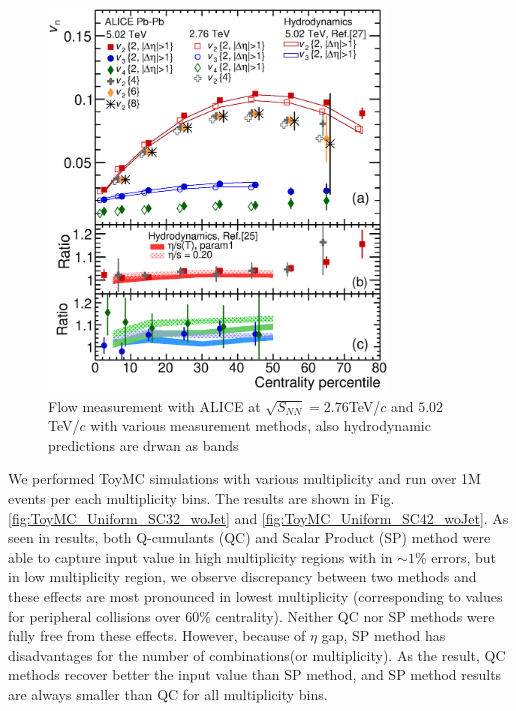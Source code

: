 \begin{figure}[h]
\begin{center}
\includegraphics[width=9.0cm]{figures/5tev_vns}
\caption{Flow measurement with ALICE at $\sqrt{S_{NN}} =  2.76$TeV/$c$ and $ 5.02$TeV/$c$ with various measurement methods, also hydrodynamic predictions are drwan as bands}
\label{vn5}
\end{center}
\end{figure}

We performed ToyMC simulations with various multiplicity and run over 1M events per each multiplicity bins. The results are shown in Fig.\ref{fig:ToyMC_Uniform_SC32_woJet} and  \ref{fig:ToyMC_Uniform_SC42_woJet}. As seen in results, both Q-cumulants (QC) and Scalar Product (SP) method were able to capture input value in high multiplicity regions with in $\sim1\%$ errors, but in low multiplicity region, we observe discrepancy between two methods and these effects are most pronounced in lowest multiplicity (corresponding to values for peripheral collisions over 60\% centrality). Neither QC nor SP methods were fully free from these effects. However, because of $\eta$ gap, SP method has disadvantages for the number of combinations(or multiplicity). As the result, QC methods recover better the input value than SP method, and SP method results are always smaller than QC for all multiplicity bins.   
	
